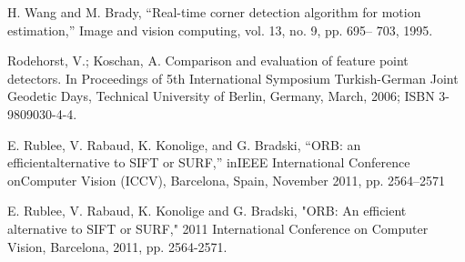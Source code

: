\documentclass[conference]{IEEEtran}
\begin{document}
\begin{thebibliography}{00}

 H. Wang and M. Brady, “Real-time corner detection algorithm for
motion estimation,” Image and vision computing, vol. 13, no. 9, pp. 695–
703, 1995.

 Rodehorst, V.; Koschan, A. Comparison and evaluation of feature point detectors. In Proceedings
of 5th International Symposium Turkish-German Joint Geodetic Days, Technical University of
Berlin, Germany, March, 2006; ISBN 3-9809030-4-4.

 E. Rublee, V. Rabaud, K. Konolige, and G. Bradski, “ORB: an efficientalternative  to  SIFT  or  SURF,”  inIEEE  International  Conference  onComputer Vision (ICCV), Barcelona, Spain, November 2011, pp. 2564–2571

 E. Rublee, V. Rabaud, K. Konolige and G. Bradski, "ORB: An efficient alternative to SIFT or SURF," 2011 International Conference on Computer Vision, Barcelona, 2011, pp. 2564-2571.



\end{thebibliography}
\end{document}
